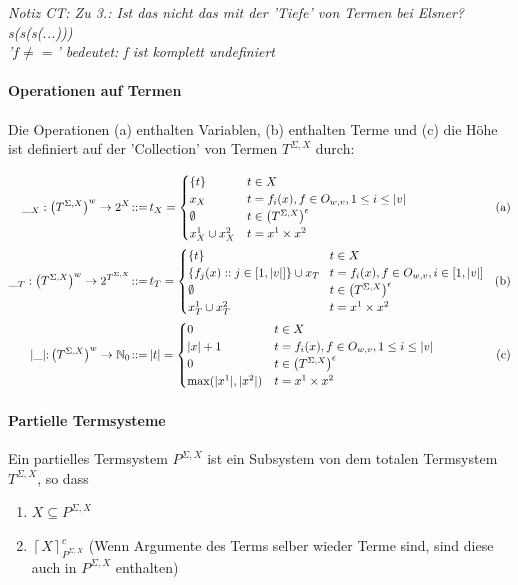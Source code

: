 \emph{Notiz CT:  Zu 3.: Ist das nicht das mit der 'Tiefe' von Termen bei Elsner? s(s(s(...))) \\
'$f \neq =$' bedeutet: f ist komplett undefiniert}


\paragraph{ Operationen auf Termen}  
Die Operationen (a) enthalten Variablen, (b) enthalten Terme und (c) die Höhe ist definiert auf der 'Collection' von Termen $T^{\Sigma, X}$ durch:

\begin{align*}
\textrm{\_}_{X}:\left(T^{\Sigma,X}\right)^{w}\rightarrow2^{X}\!::=\, & t_{X}=\begin{cases}
\{t\} & t\in X\\
x_{X} & t=f_{i}(x),f\in O_{w,v},1\leq i\leq|v|\\
\emptyset & t\in\left(T^{\Sigma,X}\right)^{\epsilon}\\
x_{X}^{1}\cup x_{X}^{2} & t=x^{1}\times x^{2}
\end{cases} & \textrm{\!(a)}\\
\textrm{\_}_{T}:\left(T^{\Sigma,X}\right)^{w}\rightarrow2^{T^{\Sigma,X}}\!::=\, & t_{T}=\begin{cases}
\{t\} & \! t\in X\\
\{f_{j}(x)::j\in[1,|v|]\}\cup x_{T} & \! t=f_{i}(x),f\in O_{w,v},i\in[1,|v|]\\
\emptyset & \! t\in\left(T^{\Sigma,X}\right)^{\epsilon}\\
x_{T}^{1}\cup x_{T}^{2} & \! t=x^{1}\times x^{2}
\end{cases} & \textrm{\!(b)}\\
|\textrm{\_|:}\left(T^{\Sigma,X}\right)^{w}\rightarrow\mathbb{N}_{0}\!::=\, & |t|=\begin{cases}
0 & t\in X\\
|x|+1 & t=f_{i}(x),f\in O_{w,v},1\leq i\leq|v|\\
0 & t\in\left(T^{\Sigma,X}\right)^{\epsilon}\\
\max(|x^{1}|,|x^{2}|) & t=x^{1}\times x^{2}
\end{cases} & \textrm{\!(c)}
\end{align*}

\paragraph{ Partielle Termsysteme}  
Ein partielles Termsystem $P^{\Sigma,X}$ ist ein Subsystem von dem totalen Termsystem $T^{\Sigma,X}$, so dass 
\begin{enumerate}
\item $X \subseteq P^{\Sigma,X}$
\item $\left\lceil X\right\rceil _{P^{\Sigma,X}}^{c}$ (Wenn Argumente des Terms selber wieder Terme sind, sind diese auch in $P^{\Sigma,X}$ enthalten)
\end{enumerate}

